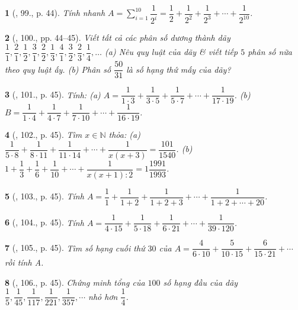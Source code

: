 \documentclass{article}
\newtheorem{baitoan}{}
\begin{document}
\begin{baitoan}[\cite{Binh_Toan_6_tap_2}, 99., p. 44]
	Tính nhanh $A = \sum_{i=1}^{10} \dfrac{1}{2^i} = \dfrac{1}{2} + \dfrac{1}{2^2} + \dfrac{1}{2^3} + \cdots + \dfrac{1}{2^10}$.
\end{baitoan}

\begin{baitoan}[\cite{Binh_Toan_6_tap_2}, 100., pp. 44--45]
	Viết tất cả các phân số dương thành dãy $\dfrac{1}{1},\dfrac{2}{1},\dfrac{1}{2},\dfrac{3}{1},\dfrac{2}{2},\dfrac{1}{3},\dfrac{4}{1},\dfrac{3}{2},\dfrac{2}{3},\dfrac{1}{4},\ldots$ (a) Nêu quy luật của dãy \& viết tiếp $5$ phân số nữa theo quy luật ấy. (b) Phân số $\dfrac{50}{31}$ là số hạng thứ mấy của dãy?
\end{baitoan}

\begin{baitoan}[\cite{Binh_Toan_6_tap_2}, 101., p. 45]
	Tính: (a) $A = \dfrac{1}{1\cdot3} + \dfrac{1}{3\cdot5} + \dfrac{1}{5\cdot7} + \cdots + \dfrac{1}{17\cdot19}$. (b) $B = \dfrac{1}{1\cdot4} + \dfrac{1}{4\cdot7} + \dfrac{1}{7\cdot10} + \cdots + \dfrac{1}{16\cdot19}$.
\end{baitoan}

\begin{baitoan}[\cite{Binh_Toan_6_tap_2}, 102., p. 45]
	Tìm $x\in\mathbb{N}$ thỏa: (a) $\dfrac{1}{5\cdot8} + \dfrac{1}{8\cdot11} + \dfrac{1}{11\cdot14} + \cdots + \dfrac{1}{x(x + 3)} = \dfrac{101}{1540}$. (b) $1 + \dfrac{1}{3} + \dfrac{1}{6} + \dfrac{1}{10} + \cdots + \dfrac{1}{x(x + 1):2} = 1\dfrac{1991}{1993}$.
\end{baitoan}

\begin{baitoan}[\cite{Binh_Toan_6_tap_2}, 103., p. 45]
	Tính $A = \dfrac{1}{1} + \dfrac{1}{1 + 2} + \dfrac{1}{1 + 2 + 3} + \cdots + \dfrac{1}{1 + 2 + \cdots + 20}$.
\end{baitoan}

\begin{baitoan}[\cite{Binh_Toan_6_tap_2}, 104., p. 45]
	Tính $A = \dfrac{1}{4\cdot15} + \dfrac{1}{5\cdot18} + \dfrac{1}{6\cdot21} + \cdots + \dfrac{1}{39\cdot120}$.
\end{baitoan}

\begin{baitoan}[\cite{Binh_Toan_6_tap_2}, 105., p. 45]
	Tìm số hạng cuối thứ $30$ của $A = \dfrac{4}{6\cdot10} + \dfrac{5}{10\cdot15} + \dfrac{6}{15\cdot21} + \cdots$ rồi tính A.
\end{baitoan}

\begin{baitoan}[\cite{Binh_Toan_6_tap_2}, 106., p. 45]
	Chứng minh tổng của $100$ số hạng đầu của dãy $\dfrac{1}{5},\dfrac{1}{45},\dfrac{1}{117},\dfrac{1}{221},\dfrac{1}{357},\cdots$ nhỏ hơn $\dfrac{1}{4}$.
\end{baitoan}
\end{document}
